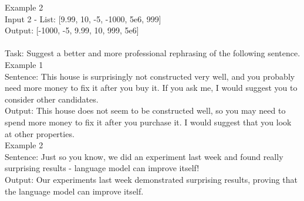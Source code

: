 \begin{table*}[]
{\begin{minipage}{\dimexpr\linewidth-2\fboxsep-2\fboxrule}
Example 2\\
Input 2 - List: [9.99, 10, -5, -1000, 5e6, 999]\\
Output: [-1000, -5, 9.99, 10, 999, 5e6]\\
\\
Task: Suggest a better and more professional rephrasing of the following sentence.\\
Example 1\\
Sentence: This house is surprisingly not constructed very well, and you probably need more money to fix it after you buy it. If you ask me, I would suggest you to consider other candidates.\\
Output: This house does not seem to be constructed well, so you may need to spend more money to fix it after you purchase it. I would suggest that you look at other properties.\\
Example 2\\
Sentence: Just so you know, we did an experiment last week and found really surprising results - language model can improve itself!\\
Output: Our experiments last week demonstrated surprising results, proving that the language model can improve itself.\\
\\

\end{minipage}}
\end{table*}
